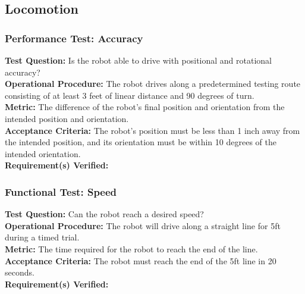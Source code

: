 
\subsection{Locomotion}
\label{sec:verification_locomotion}

\subsubsection{Performance Test: Accuracy}
\label{sec:locomotion_pt_accuracy}
\textbf{Test Question:} Is the robot able to drive with positional and rotational accuracy?\\
\textbf{Operational Procedure:} The robot drives along a predetermined testing route consisting of at least 3 feet of linear distance and 90 degrees of turn.\\
\textbf{Metric:} The difference of the robot's final position and orientation from the intended position and orientation. \\
\textbf{Acceptance Criteria:} The robot's position must be less than 1 inch away from the intended position, and its orientation must be within 10 degrees of the intended orientation.\\
\textbf{Requirement(s) Verified:} 

\subsubsection{Functional Test: Speed}
\label{sec:locomotion_ft_speed}
\textbf{Test Question:} Can the robot reach a desired speed? \\
\textbf{Operational Procedure:} The robot will drive along a straight line for 5ft during a timed trial.\\
\textbf{Metric:} The time required for the robot to reach the end of the line.\\
\textbf{Acceptance Criteria:} The robot must reach the end of the 5ft line in 20 seconds. \\
\textbf{Requirement(s) Verified:} 

